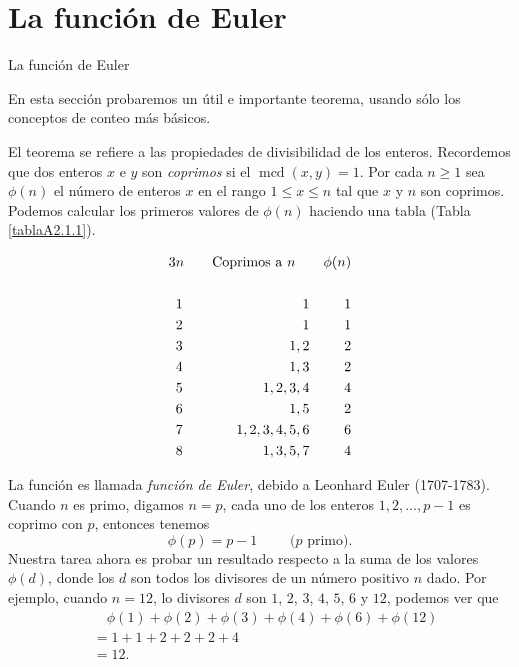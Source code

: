 \documentclass[11pt,spanish,makeidx]{amsbook}
\theoremstyle{definition}
\theoremstyle{remark}
\newcommand \mcd{\operatorname{mcd}}
\begin{document}
\appendix
\setcounter{chapter}{2}
\renewcommand{\thechapter}{\Alph{chapter}}
 \chapter[La función de Euler]{La función de Euler}

 \begin{section}{La función de Euler} \label{A2.1 }

 En esta sección probaremos un útil e importante teorema, usando sólo
 los conceptos de conteo más básicos.

 El teorema se refiere a las
 propiedades de divisibilidad de los enteros. Recordemos que dos enteros $x$ e
 $y$ son {\it coprimos} si el $\mcd(x,y) = 1$. Por cada $n \ge 1$ sea
 $\phi(n)$ el número de
 enteros $x$ en el rango $1 \le x \le n$ tal que $x$ y $n$ son coprimos.
 Podemos
 calcular los primeros valores de $\phi(n)$ haciendo una tabla (Tabla
 \ref{tablaA2.1.1}).

 \begin{table}[h]
 \begin{alignat*}3
 &n& \text{\quad Coprimos a $n$\quad }& &\phi(n)&\\
&&&&&\\
 &1&1&&1& \\
 &2&1&&1& \\
 &3&1,2&&2& \\
 &4&1,3&&2& \\
 &5&1,2,3,4&&4& \\
 &6&1,5&&2& \\
 &7&1,2,3,4,5,6&&6& \\
 &8&1,3,5,7&&4&
 \end{alignat*}
\caption{} \label{tablaA2.1.1}
\end{table}

La función es llamada {\em función de Euler}, debido a Leonhard
Euler   (1707-1783). Cuando $n$ es primo,
digamos $n=p$, cada uno de los enteros $1,2,\ldots,p-1$ es coprimo
con $p$, entonces tenemos
$$
\phi(p)=p-1\qquad\text{ ($p$ primo).}
$$
Nuestra tarea ahora es probar un resultado respecto a la suma de
los valores $\phi(d)$, donde los $d$ son todos los divisores de un
número positivo $n$ dado. Por ejemplo, cuando $n=12$, lo divisores
$d$ son $1$, $2$, $3$, $4$, $5$, $6$ y $12$, podemos ver que
\begin{align*}
&\quad\phi(1)+\phi(2)+\phi(3)+\phi(4)+\phi(6)+\phi(12)\\
&= 1 +1+2+2+2+4 \\
&=12.
\end{align*}


\end{section}
\end{document}
